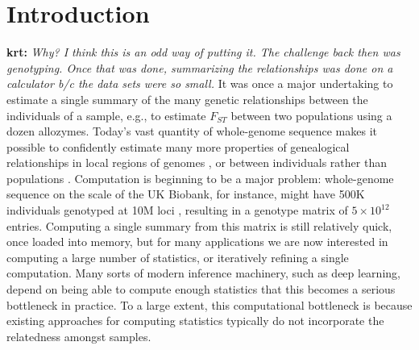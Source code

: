 \documentclass{article}
\newcommand{\krt}[1]{{\color{green}\textbf{krt:} \it #1}}
\begin{document}
%
%
%
%
%
%
%
%
%



\section*{Introduction}

\krt{Why? I think this is an odd way of putting it.  The challenge back then was
    genotyping.  Once that was done, summarizing the relationships was done on a 
    calculator b/c the data sets were so small.}
It was once a major undertaking to estimate a single summary
of the many genetic relationships between the individuals of a sample,
e.g., to estimate $F_{ST}$ between two populations using a dozen allozymes.
Today's vast quantity of whole-genome sequence
makes it possible to confidently estimate many more properties of genealogical relationships
in local regions of genomes \citep{stankowski2019widespread,fst_landscapes},
or between individuals rather than populations \citep{individual_stats}.
Computation is beginning to be a major problem:
whole-genome sequence on the scale of the UK Biobank,
for instance, might have 500K individuals genotyped at 10M loci \citep{ukbb},
resulting in a genotype matrix of $5 \times 10^{12}$ entries.
Computing a single summary from this matrix is still relatively quick,
once loaded into memory,
but for many applications we are now interested in computing a large number of statistics,
or iteratively refining a single computation.
Many sorts of modern inference machinery, such as deep learning,
depend on being able to compute enough statistics that this becomes a serious bottleneck in practice.
To a large extent, this computational bottleneck is because existing approaches for computing statistics
typically do not incorporate the relatedness amongst samples.
\end{document}
